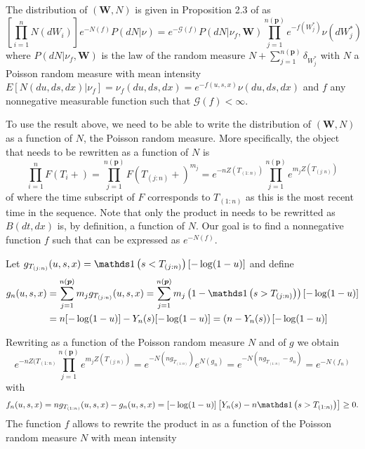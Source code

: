 The distribution of $(\boldsymbol{W}, N)$ is given in Proposition 2.3 of \cite{james2005poisson} as
\begin{equation}\label{james_poisson_joint}
\left[\prod_{i=1}^n N(dW_i)\right]e^{-N(f)}P(dN|\nu) = e^{-\mathcal{G}(f)}P(dN|\nu_f, \boldsymbol{W}) \prod_{j=1}^{n(\boldsymbol{p})} e^{-f(W_j^*)}\nu(dW_j^*)
\end{equation}
where $P(dN|\nu_f, \boldsymbol{W})$ is the law of the random measure $N + \sum_{j=1}^{n(\boldsymbol{p})} \delta_{W_j^*}$ with $N$ a Poisson random measure with mean intensity $E[N(du, ds, dx)|\nu_f] = \nu_f(du, ds,dx) = e^{-f(u,s,x)}\nu(du,ds,dx)$ and  $f$ any nonnegative measurable function such that $\mathcal{G}(f) < \infty$.

To use the result above, we need to be able to write the distribution of $(\boldsymbol{W}, N)$ as a function of $N$, the Poisson random measure. More specifically, the object that needs to be rewritten as a function of $N$ is
\begin{equation}\label{product_f}
\prod_{i=1}^n F\left(T_i + \right) = \prod_{j=1}^{n(\boldsymbol{p})} F\left(T_{(j:n)} + \right)^{m_j} = e^{-nZ(T_{(1:n)})} \prod_{j=1}^{n(\boldsymbol{p})} e^{m_j Z(T_{(j:n)})}
\end{equation}
of  where the time subscript of $F$ corresponds to $T_{(1:n)}$ as this is the most recent time in the sequence. Note that only the product in  needs to be rewritted as $B(dt, dx)$ is, by definition, a function of $N$. Our goal is to find a nonnegative function $f$ such that  can be expressed as $e^{-N(f)}$.

Let $g_{T_{(j:n)}}(u,s,x) = \indicator\left(s < T_{(j:n)}\right)[-\log(1-u)]$ and define 
\begin{equation*}
\begin{split}
g_n(u,s,x) &= \sum_{j=1}^{n(\boldsymbol{p})} m_j g_{T_{(j:n)}}(u,s,x) = \sum_{j=1}^{n(\boldsymbol{p})} m_j \left(1 - \indicator\left(s > T_{(j:n)}\right)\right)[-\log(1-u)]\\ &= n[-\log(1-u)] - Y_n(s)[-\log(1-u)] = \left(n- Y_n(s)\right)[-\log(1-u)]
\end{split}
\end{equation*}

Rewriting  as a function of the Poisson random measure $N$ and of $g$ we obtain
\begin{equation*}
e^{-nZ(T_{(1:n)}} \prod_{j=1}^{n(\boldsymbol{p})} e^{m_j Z(T_{(j:n)})} = e^{-N\left(ng_{T_{(1:n)}}\right)} e^{N(g_n)}  = e^{-N\left(ng_{T_{(1:n)}} - g_n\right)} = e^{-N(f_n)}
\end{equation*}
with
\begin{equation*}
f_n(u,s,x) = ng_{T_{(1:n)}}(u,s,x) - g_n(u,s,x) = [-\log(1-u)]\left[Y_n(s) - n\indicator\left(s > T_{(1:n)}\right)\right] \geq 0.
\end{equation*}
The function $f$ allows to rewrite the product in  as a function of the Poisson random measure $N$  with mean intensity

